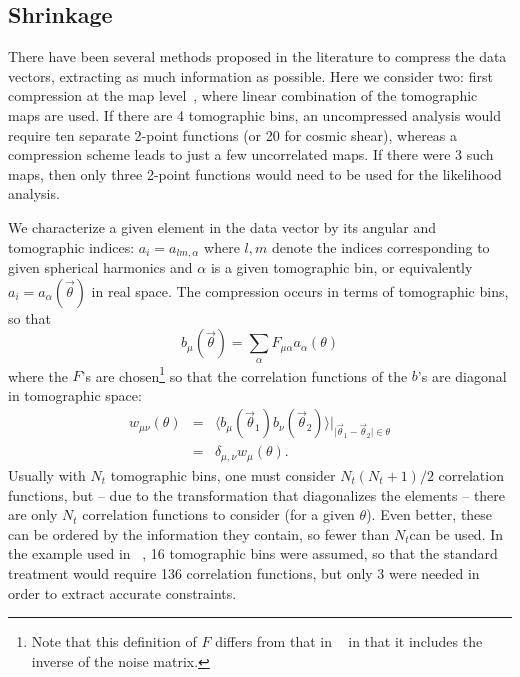 \documentclass[twocolumn]{\docclass}
\newcommand\be{\begin{equation}}
\newcommand\ee{\end{equation}}
\def\bea{\begin{eqnarray}}
\def\eea{\end{eqnarray}}
\def\svs{\nonumber\\}
\begin{document}
\subsection{Shrinkage}

There have been several methods proposed in the literature to compress the data vectors, extracting as much information as possible. Here we consider two: first compression at the map level~\citep{Alonso:2017hhj}, where linear combination of the tomographic maps are used. If there are 4 tomographic bins, an uncompressed analysis would require ten separate 2-point functions (or 20 for cosmic shear), whereas a compression scheme leads to just a few uncorrelated maps. If there were 3 such maps, then only three 2-point functions would need to be used for the likelihood analysis.

We characterize a given element in the data vector by its angular and tomographic indices: $a_i = a_{lm,\alpha}$ where $l,m$ denote the indices corresponding to given spherical harmonics and $\alpha$ is a given tomographic bin, or equivalently $a_i = a_\alpha(\vec\theta)$ in real space. The compression occurs in terms of tomographic bins, so that 
\be
b_\mu(\vec\theta) = \sum_{\alpha} F_{\mu\alpha} a_\alpha(\theta)
\ee
where the $F$'s are chosen\footnote{Note that this definition of $F$ differs from that in ~\citep{Alonso:2017hhj} in that it includes the inverse of the noise matrix.} so that the correlation functions of the $b$'s are diagonal in tomographic space: 
\bea
w_{\mu\nu}(\theta) &=& \langle b_\mu(\vec\theta_1) b_\nu(\vec\theta_2)\rangle\vert_{\vert\vec\theta_1-\vec\theta_2\vert\in\theta}
\svs
&=& \delta_{\mu,\nu} w_{\mu}(\theta).
\eea
Usually with $N_t$ tomographic bins, one must consider $N_t(N_t+1)/2$ correlation functions, but -- due to the transformation that diagonalizes the elements -- there are only $N_t$ correlation functions to consider (for a given $\theta$). Even better, these can be ordered by the information they contain, so fewer than $N_t$can be used. In the example used in ~\citep{Alonso:2017hhj}, 16 tomographic bins were assumed, so that the standard treatment would require 136 correlation functions, but only 3 were needed in order to extract accurate constraints. 
\end{document}
